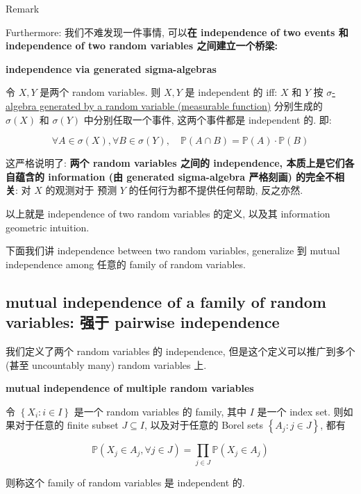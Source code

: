 \documentclass{qlnotes-export}
\begin{document}
\begin{qlremark}{Remark}

Furthermore: 我们不难发现一件事情, 可以\textbf{在 independence of two events 和 independence of two random variables 之间建立一个桥梁:}

\begin{proposition}{\protect{}\label{kn-independence-via-generated-sigma-algebras}{\textbf{independence
via generated sigma-algebras}}}

令 \(X,Y\) 是两个 random variables. 则 \(X,Y\) 是 independent 的 iff: \(X\) 和 \(Y\) 按 \href{https://qiulinfan.github.io/notes/math/probability/\#kn-sigma-algebra-generated-by-a-random-variable-measurable-function}{\(\sigma\)-algebra generated by a random variable (measurable function)} 分别生成的 \(\sigma(X)\) 和 \(\sigma(Y)\) 中分别任取一个事件, 这两个事件都是 independent 的. 即:

\[\forall A \in \sigma(X),\forall B \in \sigma(Y),\quad{\mathbb{P}}(A \cap B) = {\mathbb{P}}(A) \cdot {\mathbb{P}}(B)\]

\end{proposition}

这严格说明了: \textbf{两个 random variables 之间的 independence, 本质上是它们各自蕴含的 information (由 generated sigma-algebra 严格刻画) 的完全不相关}: 对 \(X\) 的观测对于 预测 \(Y\) 的任何行为都不提供任何帮助, 反之亦然.\\

\end{qlremark}

以上就是 independence of two random variables 的定义, 以及其 information geometric intuition.

下面我们讲 independence between two random variables, generalize 到 mutual independence among 任意的 family of random variables.

\subsection{mutual independence of a family of random variables: 强于 pairwise independence}\label{mutual-independence-of-a-family-of-random-variables-ux5f3aux4e8e-pairwise-independence}

我们定义了两个 random variables 的 independence, 但是这个定义可以推广到多个 (甚至 uncountably many) random variables 上.

\begin{definition}{\protect{}\label{kn-mutual-independence-of-multiple-random-variables}{\textbf{\textbf{mutual
independence} of multiple random variables}}}

令 \(\left\{ {X_{i}:i \in I} \right\}\) 是一个 random variables 的 family, 其中 \(I\) 是一个 index set. 则如果对于任意的 finite subset \(J \subseteq I\), 以及对于任意的 Borel sets \(\left\{ {A_{j}:j \in J} \right\}\), 都有

\[{\mathbb{P}}(X_{j} \in A_{j},\forall j \in J) = \prod\limits_{j \in J}{\mathbb{P}}(X_{j} \in A_{j})\]

则称这个 family of random variables 是 independent 的.

\end{definition}
\end{document}
